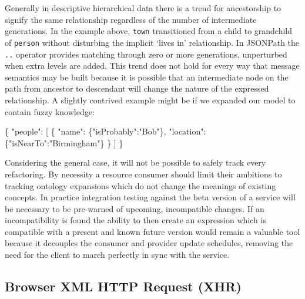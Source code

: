 \documentclass[12pt, ]{article}
\newenvironment{Shaded}{}{}
\newcommand{\StringTok}[1]{\textcolor[rgb]{0.25,0.44,0.63}{{#1}}}
\newcommand{\NormalTok}[1]{{#1}}
\begin{document}
Generally in descriptive hierarchical data there is a trend for
ancestorship to signify the same relationship regardless of the number
of intermediate generations. In the example above, \texttt{town}
transitioned from a child to grandchild of \texttt{person} without
disturbing the implicit `lives in' relationship. In JSONPath the
\texttt{..} operator provides matching through zero or more generations,
unperturbed when extra levels are added. This trend does not hold for
every way that message semantics may be built because it is possible
that an intermediate node on the path from ancestor to descendant will
change the nature of the expressed relationship. A slightly contrived
example might be if we expanded our model to contain fuzzy knowledge:

\begin{Shaded}
\begin{Highlighting}[]
\NormalTok{\{}
   \StringTok{"people"}\NormalTok{: [}
      \NormalTok{\{  }
         \StringTok{"name"}\NormalTok{:     \{}\StringTok{"isProbably"}\NormalTok{:}\StringTok{"Bob"}\NormalTok{\},}
         \StringTok{"location"}\NormalTok{: \{}\StringTok{"isNearTo"}\NormalTok{:}\StringTok{"Birmingham"}\NormalTok{\}}
      \NormalTok{\}}
   \NormalTok{]   }
\NormalTok{\}}
\end{Highlighting}
\end{Shaded}

Considering the general case, it will not be possible to safely track
every refactoring. By necessity a resource consumer should limit their
ambitions to tracking ontology expansions which do not change the
meanings of existing concepts. In practice integration testing against
the beta version of a service will be necessary to be pre-warned of
upcoming, incompatible changes. If an incompatibility is found the
ability to then create an expression which is compatible with a present
and known future version would remain a valuable tool because it
decouples the consumer and provider update schedules, removing the need
for the client to march perfectly in sync with the service.

\subsection{Browser XML HTTP Request
(XHR)}\label{browser-xml-http-request-xhr}
\end{document}

